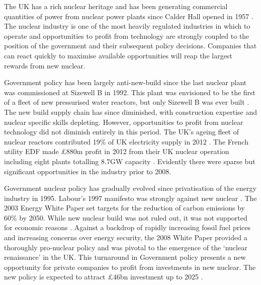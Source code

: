 {}

The UK has a rich nuclear heritage and has been generating commercial quantities of power from nuclear power plants since Calder Hall opened in 1957 \cite{NDA2007}. 
The nuclear industry is one of the most heavily regulated industries in which to operate and opportunities to profit from technology are strongly coupled to the position of the government and their subsequent policy decisions. 
Companies that can react quickly to maximise available opportunities will reap the largest rewards from new nuclear.

Government policy has been largely anti-new-build since the last nuclear plant was commissioned at Sizewell B in 1992. 
This plant was envisioned to be the first of a fleet of new pressurised water reactors, but only Sizewell B was ever built \cite{WNA2014}. 
The new build supply chain has since diminished, with construction expertise and nuclear specific skills depleting.
However, opportunities to profit from nuclear technology did not diminish entirely in this period. 
The UK's ageing fleet of nuclear reactors contributed 19\% of UK electricity supply in 2012 \cite{WNA2014}.  
The French utility EDF made \pounds880m profit in 2012 from their UK nuclear operation including eight plants totalling 8.7GW capacity \cite{EDF2012}. 
Evidently there were sparse but significant opportunities in the industry prior to 2008.

Government nuclear policy has gradually evolved since privatisation of the energy industry in 1995. 
Labour’s 1997 manifesto was strongly against new nuclear \cite{Birmingham2012}. 
The 2003 Energy White Paper set targets for the reduction of carbon emissions by 60\% by 2050. 
While new nuclear build was not ruled out, it was not supported for economic reasons \cite{WP2006}. 
Against a backdrop of rapidly increasing fossil fuel prices and increasing concerns over energy security, the 2008 White Paper provided a thoroughly pro-nuclear policy \cite{WP2008} and was pivotal to the emergence of the `nuclear renaissance’ in the UK.
This turnaround in Government policy presents a new opportunity for private companies to profit from investments in new nuclear. 
The new policy is expected to attract \pounds46bn investment up to 2025 \cite{needtofindthefigure}.


